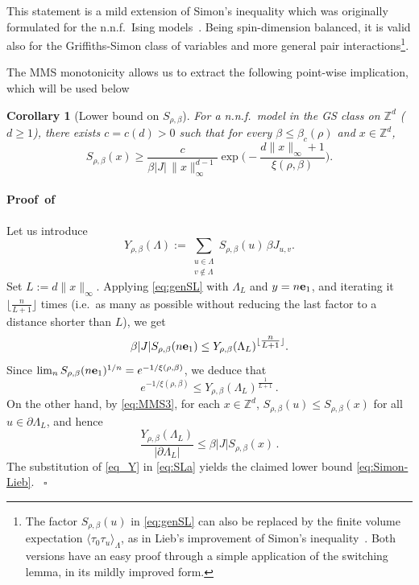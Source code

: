 \documentclass[a4paper,oneside,11pt]{article}
\def\Z{\mathbb{Z}}                          %
\newtheorem{corollary}[theorem]{Corollary}
\newcommand{\be}[1]{\begin{equation}\label{#1}}
\newcommand{\ee}{\end{equation}}
\numberwithin{equation}{section}
\numberwithin{equation}{section}
\numberwithin{equation}{section}
\newenvironment{proof}[1][\relax]%
  {\paragraph{Proof\ifx#1\relax\else~of #1\fi}}%
  {~\hfill$\square$\par\bigskip}
\def\Z{\mathbb{Z}}                          %
\def\be{\begin{equation}}
\def\ee{\end{equation}}
\begin{document}
This statement is a mild extension of Simon's inequality which was originally formulated for the n.n.f.~Ising models~\cite{Sim80}.  Being spin-dimension balanced,  it is valid also for the Griffiths-Simon class of variables  and more general pair interactions\footnote{The factor $S_{\rho,\beta}(u)$ in \eqref{eq:genSL} can also be replaced  by the finite volume expectation $\langle \tau_0 \tau_u\rangle_\Lambda$, as in Lieb's improvement of Simon's inequality~\cite{Lie80}.     
Both versions have an easy proof through a simple application of the switching lemma, in its mildly improved form.}.

The MMS monotonicity allows us to extract the following point-wise implication, which will be used below 
  
\begin{corollary}[Lower bound on $S_{\rho,\beta}$]\label{cor:SL}
For {a n.n.f.~model in the GS class} on $\Z^d$ ($d\ge1$), there exists $c=c(d)>0$ such that for every $\beta\le\beta_c(\rho)$ and  $x\in\Z^d$,
\be\label{eq:Simon-Lieb}
S_{\rho,\beta}(x)\ge \frac{c}{\beta |J|\,\|x\|_\infty^{d-1}}\exp\big(-\frac{d\|x\|_\infty+1}{\xi(\rho,\beta)}\big).
\ee
\end{corollary}
\begin{proof} 


Let us introduce
\be
Y_{\rho,\beta}(\Lambda):=\sum_{\substack{u\in \Lambda\\ v\notin \Lambda}}S_{\rho,\beta}(u)\,\beta J_{u,v}.
\ee
Set $L:=d\|x\|_\infty$. Applying  \eqref{eq:genSL} with $\Lambda_L$ and $y=n{\bf e}_1$, and iterating it $\lfloor \tfrac{n}{L+1}\rfloor$ times (i.e.~as many as possible without reducing the last factor to a distance shorter than $L$),   we get
\be
\beta |J| S_{\rho,\beta}(n{\bf e}_1)\le Y_{\rho,\beta}(\Lambda_{L})^{\lfloor \tfrac{n}{L+1}\rfloor}.
\ee
Since $ \lim_n S_{\rho,\beta}(n{\bf e}_1)^{1/n} = e^{-1/\xi(\rho,\beta)}$, we deduce that  
\be \label{eq_Y}
e^{-1/\xi(\rho,\beta)}   \leq   Y_{\rho,\beta}(\Lambda_{L})^{ \tfrac{1}{L+1} }\,. 
\ee 
On the other hand, by \eqref{eq:MMS3}, for each $x\in \Z^d$,   $ S_{\rho,\beta}(u) \leq S_{\rho,\beta}(x) $  for all $u\in \partial\Lambda_L$, and hence
\begin{equation}\label{eq:SLa} \frac{Y_{\rho,\beta}(\Lambda_{L})}{|\partial\Lambda_{L}|} \leq \beta  |J|S_{\rho,\beta}(x)  \, .\end{equation}
The substitution of  \eqref{eq_Y} in \eqref{eq:SLa} yields the claimed lower bound \eqref{eq:Simon-Lieb}.
\end{proof}
\end{document}
